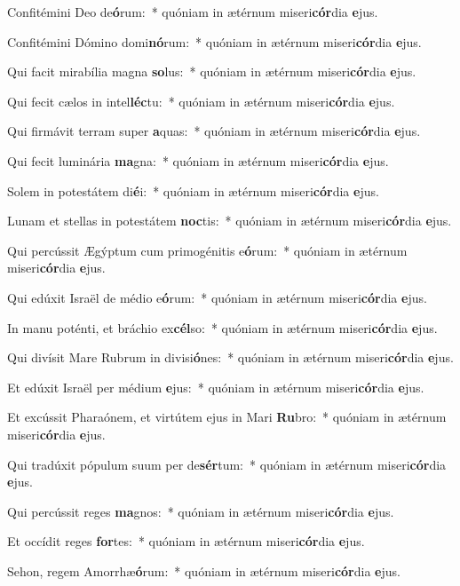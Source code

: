 \item Confitémini Deo de\textbf{ó}rum:~* quóniam in ætérnum miseri\textbf{cór}dia \textbf{e}jus.
\item Confitémini Dómino domi\textbf{nó}rum:~* quóniam in ætérnum miseri\textbf{cór}dia \textbf{e}jus.
\item Qui facit mirabília magna \textbf{so}lus:~* quóniam in ætérnum miseri\textbf{cór}dia \textbf{e}jus.
\item Qui fecit cælos in intel\textbf{léc}tu:~* quóniam in ætérnum miseri\textbf{cór}dia \textbf{e}jus.
\item Qui firmávit terram super \textbf{a}quas:~* quóniam in ætérnum miseri\textbf{cór}dia \textbf{e}jus.
\item Qui fecit luminária \textbf{ma}gna:~* quóniam in ætérnum miseri\textbf{cór}dia \textbf{e}jus.
\item Solem in potestátem di\textbf{é}i:~* quóniam in ætérnum miseri\textbf{cór}dia \textbf{e}jus.
\item Lunam et stellas in potestátem \textbf{noc}tis:~* quóniam in ætérnum miseri\textbf{cór}dia \textbf{e}jus.
\item Qui percússit Ægýptum cum primogénitis e\textbf{ó}rum:~* quóniam in ætérnum miseri\textbf{cór}dia \textbf{e}jus.
\item Qui edúxit Israël de médio e\textbf{ó}rum:~* quóniam in ætérnum miseri\textbf{cór}dia \textbf{e}jus.
\item In manu poténti, et bráchio ex\textbf{cél}so:~* quóniam in ætérnum miseri\textbf{cór}dia \textbf{e}jus.
\item Qui divísit Mare Rubrum in divisi\textbf{ó}nes:~* quóniam in ætérnum miseri\textbf{cór}dia \textbf{e}jus.
\item Et edúxit Israël per médium \textbf{e}jus:~* quóniam in ætérnum miseri\textbf{cór}dia \textbf{e}jus.
\item Et excússit Pharaónem, et virtútem ejus in Mari \textbf{Ru}bro:~* quóniam in ætérnum miseri\textbf{cór}dia \textbf{e}jus.
\item Qui tradúxit pópulum suum per de\textbf{sér}tum:~* quóniam in ætérnum miseri\textbf{cór}dia \textbf{e}jus.
\item Qui percússit reges \textbf{ma}gnos:~* quóniam in ætérnum miseri\textbf{cór}dia \textbf{e}jus.
\item Et occídit reges \textbf{for}tes:~* quóniam in ætérnum miseri\textbf{cór}dia \textbf{e}jus.
\item Sehon, regem Amorrhæ\textbf{ó}rum:~* quóniam in ætérnum miseri\textbf{cór}dia \textbf{e}jus.
